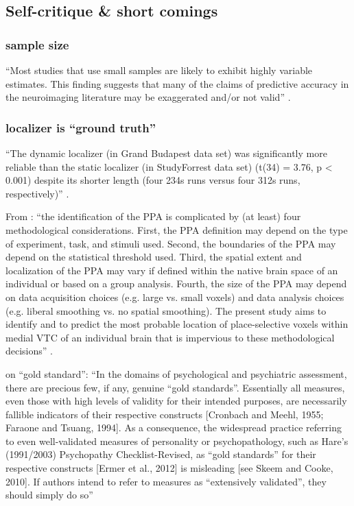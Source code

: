 \subsection{Self-critique \& short comings}


\subsubsection{sample size}

``Most studies that use small samples are likely to exhibit highly variable
estimates. This finding suggests that many of the claims of predictive accuracy
in the neuroimaging literature may be exaggerated and/or not valid''
\citep{poldrack2019establishment}.


\subsubsection{localizer is ``ground truth''}

%
``The dynamic localizer (in Grand Budapest data set) was significantly more
reliable than the static localizer (in StudyForrest data set) (t(34) = 3.76, p <
0.001) despite its shorter length (four 234s runs versus four 312s runs,
respectively)'' \citep{jiahui2020predicting}.

%
From \citep{weiner2018defining}: ``the identification of the PPA is complicated
by (at least) four methodological considerations. First, the PPA definition may
depend on the type of experiment, task, and stimuli used. Second, the boundaries
of the PPA may depend on the statistical threshold used. Third, the spatial
extent and localization of the PPA may vary if defined within the native brain
space of an individual or based on a group analysis. Fourth, the size of the PPA
may depend on data acquisition choices (e.g. large vs. small voxels) and data
analysis choices (e.g. liberal smoothing vs. no spatial smoothing). The present
study aims to identify and to predict the most probable location of
place-selective voxels within medial VTC of an individual brain that is
impervious to these methodological decisions'' \citep{weiner2018defining}.

%
\citet{lilienfeld2015fifty} on ``gold standard'': ``In the domains of
psychological and psychiatric assessment, there are precious few, if any,
genuine ``gold standards''. Essentially all measures, even those with high
levels of validity for their intended purposes, are necessarily fallible
indicators of their respective constructs [Cronbach and Meehl, 1955; Faraone and
Tsuang, 1994]. As a consequence, the widespread practice referring to even
well-validated measures of personality or psychopathology, such as Hare’s
(1991/2003) Psychopathy Checklist-Revised, as ``gold standards'' for their
respective constructs [Ermer et al., 2012] is misleading [see Skeem and Cooke,
2010]. If authors intend to refer to measures as ``extensively validated'', they
should simply do so'' \citep{lilienfeld2015fifty}

